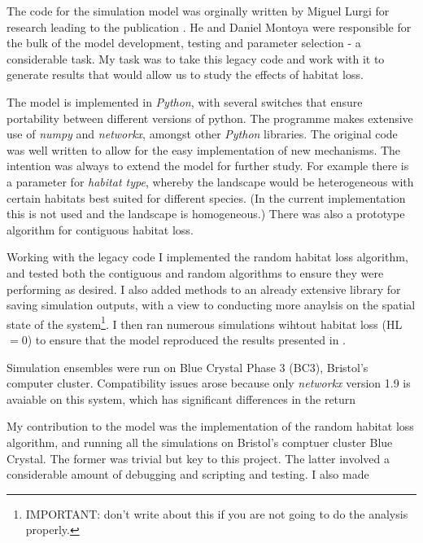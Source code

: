 

%

The code for the simulation model was orginally written by Miguel Lurgi for research leading to the publication \cite{lurgi2015effects}. He and Daniel Montoya were responsible for the bulk of the model development, testing and parameter selection - a considerable task. My task was to take this legacy code and work with it to generate results that would allow us to study the effects of habitat loss.

The model is implemented in \emph{Python}, with several switches that ensure portability between different versions of python. The programme makes extensive use of \emph{numpy} and \emph{networkx}, amongst other \emph{Python} libraries. The original code was well written to allow for the easy implementation of new mechanisms. The intention was always to extend the model for further study. For example there is a parameter for \emph{habitat type}, whereby the landscape would be heterogeneous with certain habitats best suited for different species. (In the current implementation this is not used and the landscape is homogeneous.) There was also a prototype algorithm for contiguous habitat loss.  

Working with the legacy code I implemented the random habitat loss algorithm, and tested both the contiguous and random algorithms to ensure they were performing as desired. I also added methods to an already extensive library for saving simulation outputs, with a view to conducting more anaylsis on the spatial state of the system\footnote{IMPORTANT: don't write about this if you are not going to do the analysis properly.}. I then ran numerous simulations wihtout habitat loss (HL$ =0$) to ensure that the model reproduced the results presented in \cite{lurgi2015effects}. 

Simulation ensembles were run on Blue Crystal Phase 3 (BC3), Bristol's computer cluster. Compatibility issues arose because only \emph{networkx} version 1.9 is avaiable on this system, which has significant differences in the return  



My contribution to the model was the implementation of the random habitat loss algorithm, and running all the simulations on Bristol's comptuer cluster Blue Crystal. The former was trivial but key to this project. The latter involved a considerable amount of debugging and scripting and testing. I also made  

